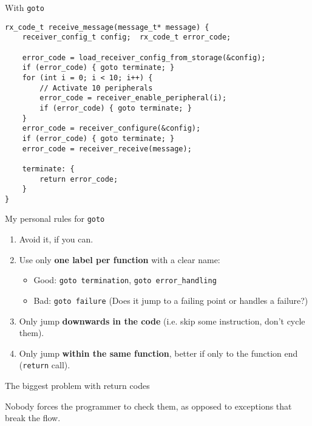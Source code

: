 \documentclass[aspectratio=169,14pt]{beamer}
\begin{document}
\begin{frame}[fragile]{With \texttt{goto}}
\begin{lstlisting}[style=cstyle]
rx_code_t receive_message(message_t* message) {
    receiver_config_t config;  rx_code_t error_code;
    
    error_code = load_receiver_config_from_storage(&config);
    if (error_code) { goto terminate; }
    for (int i = 0; i < 10; i++) {
        // Activate 10 peripherals
        error_code = receiver_enable_peripheral(i);
        if (error_code) { goto terminate; }
    }
    error_code = receiver_configure(&config);
    if (error_code) { goto terminate; }
    error_code = receiver_receive(message);
    
    terminate: {
        return error_code;
    }
}
\end{lstlisting}
\end{frame}

\begin{frame}{My personal rules for \texttt{goto}}
\begin{enumerate}
    \item Avoid it, if you can.
    \item Use only \textbf{one label per function} with a clear name:
        \begin{itemize}
            \item Good: \texttt{goto termination}, \texttt{goto error\_handling}
            \item Bad: \texttt{goto failure}  (Does it jump to a failing point or handles a failure?)
        \end{itemize}
    \item Only jump \textbf{downwards in the code} (i.e. skip some instruction, don’t cycle them).
    \item Only jump \textbf{within the same function}, better if only to the function end (\texttt{return} call).
\end{enumerate}
\end{frame}

\begin{frame}{The biggest problem with return codes}
\begin{center}
Nobody forces the programmer to check them, as opposed to exceptions that break the flow.
\end{center}
\end{frame}
\end{document}
